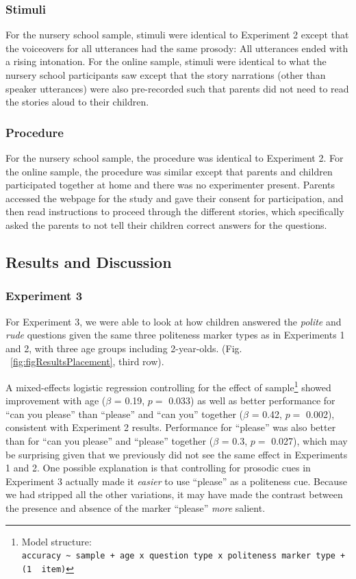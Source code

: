 \documentclass[oneside]{report}
\begin{document}
\subsubsection{Stimuli}\label{stimuli}

For the nursery school sample, stimuli were identical to Experiment 2
except that the voiceovers for all utterances had the same prosody: All
utterances ended with a rising intonation. For the online sample,
stimuli were identical to what the nursery school participants saw
except that the story narrations (other than speaker utterances) were
also pre-recorded such that parents did not need to read the stories
aloud to their children.

\subsubsection{Procedure}\label{procedure-2}

For the nursery school sample, the procedure was identical to Experiment
2. For the online sample, the procedure was similar except that parents
and children participated together at home and there was no experimenter
present. Parents accessed the webpage for the study and gave their
consent for participation, and then read instructions to proceed through
the different stories, which specifically asked the parents to not tell
their children correct answers for the questions.

\subsection{Results and Discussion}\label{results-and-discussion-2}

\subsubsection{Experiment 3}\label{experiment-3-1}

For Experiment 3, we were able to look at how children answered the
\emph{polite} and \emph{rude} questions given the same three politeness
marker types as in Experiments 1 and 2, with three age groups including
2-year-olds. (Fig. ~\ref{fig:figResultsPlacement}, third row).

A mixed-effects logistic regression controlling for the effect of
sample\footnote{Model structure:
  \texttt{accuracy\ \textasciitilde{}\ sample\ +\ age\ x\ question\ type\ x\ politeness\ marker\ type\ +\ (1\ \textbar{}\ item)}}
showed improvement with age (\(\beta\) = 0.19, \(p =\) 0.033) as well as
better performance for ``can you please'' than ``please'' and ``can
you'' together (\(\beta\) = 0.42, \(p =\) 0.002), consistent with
Experiment 2 results. Performance for ``please'' was also better than
for ``can you please'' and ``please'' together (\(\beta\) = 0.3, \(p =\)
0.027), which may be surprising given that we previously did not see the
same effect in Experiments 1 and 2. One possible explanation is that
controlling for prosodic cues in Experiment 3 actually made it
\emph{easier} to use ``please'' as a politeness cue. Because we had
stripped all the other variations, it may have made the contrast between
the presence and absence of the marker ``please'' \emph{more} salient.
\end{document}
